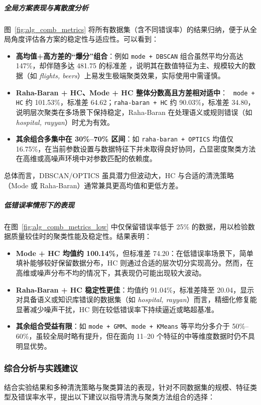 \documentclass[10pt]{article} %
\numberwithin{equation}{section}
\begin{document}
\subparagraph{全局方案表现与离散度分析}
图~\ref{fig:alg_comb_metrics} 将所有数据集（含不同错误率）的结果归纳，便于从全局角度评估各方案的稳定性与适应性。可以看到：
\begin{itemize}
    \item \textbf{高均值+高方差的“爆分”组合}：例如 \texttt{mode + DBSCAN} 组合虽然平均分高达 147\%，却伴随多达 481.75 的标准差 ，说明其在数值特征为主、规模较大的数据（如 \textit{flights, beers}）上易发生极端聚类效果，实际使用中需谨慎。
    \item \textbf{Raha-Baran + HC、Mode + HC 整体分数高且方差相对适中}： \texttt{ mode + HC} 约 101.53\%，标准差 64.62；\texttt{raha-baran + HC} 约 90.03\%，标准差 34.80，说明层次聚类在多场景下保持稳定，Raha-Baran 在处理语义或规则错误（如 \textit{hospital, rayyan}）时尤为有效。
    \item \textbf{其余组合多集中在 30\%--70\% 区间}：如 \texttt{raha-baran + OPTICS} 均值仅 16.75\%，在当前参数设置与数据特征下并未取得良好协同，凸显密度聚类方法在高维或高噪声环境中对参数匹配的依赖度。
\end{itemize}
总体而言，DBSCAN/OPTICS 虽具潜力但波动大，HC 与合适的清洗策略（Mode 或 Raha-Baran）通常兼具更高均值和更低方差。

\subparagraph{低错误率情形下的表现}
在图~\ref{fig:alg_comb_metrics_low} 中仅保留错误率低于 25\% 的数据，用以检验数据质量较佳时的聚类性能及稳定性。结果表明：
\begin{itemize}
    \item \textbf{Mode + HC 均值约 100.14\%}，但标准差 74.20：在低错误率场景下，简单填补能够较好保留数据分布，HC 则通过合适的层次切分实现高分。然而，在高维或噪声分布不均的情况下，其表现仍可能出现较大波动。
    \item \textbf{Raha-Baran + HC 稳定性更佳}：均值约 91.04\%，标准差降至 20.04，显示对具备语义或知识库错误的数据集（如 \textit{hospital, rayyan}）而言，精细化修复能显著减少噪声干扰，HC 则在较低错误率下持续逼近或略超基准。
    \item \textbf{其余组合受益有限}：如 \texttt{mode + GMM}、\texttt{mode + KMeans} 等平均分多介于 50\%--60\%，虽较全局时略有提升，但在面向 11--20 个特征的中等维度数据时仍不具明显优势。
\end{itemize}

\subsubsection{综合分析与实践建议}
结合实验结果和多种清洗策略与聚类算法的表现，针对不同数据集的规模、特征类型及错误率水平，提出以下建议以指导清洗与聚类方法组合的选择：
\end{document}
